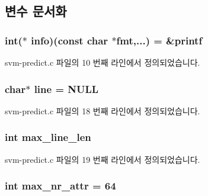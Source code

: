 \subsection{변수 문서화}
\hypertarget{svm-predict_8c_ab42d5f876cd10cdae152b4acbf2e7b8b}{
\subsubsection[{info}]{\setlength{\rightskip}{0pt plus 5cm}int($\ast$ info)(const char $\ast$fmt,...) = \&printf\hspace{0.3cm}{\ttfamily [static]}}}\label{svm-predict_8c_ab42d5f876cd10cdae152b4acbf2e7b8b}


svm-\/predict.\+c 파일의 10 번째 라인에서 정의되었습니다.

\hypertarget{svm-predict_8c_a8adb30f4f6669f927fd9232f686c637b}{
\subsubsection[{line}]{\setlength{\rightskip}{0pt plus 5cm}char$\ast$ line = N\+U\+L\+L\hspace{0.3cm}{\ttfamily [static]}}}\label{svm-predict_8c_a8adb30f4f6669f927fd9232f686c637b}


svm-\/predict.\+c 파일의 18 번째 라인에서 정의되었습니다.

\hypertarget{svm-predict_8c_acad24c15bee67d2026f56bc94a1188c7}{
\subsubsection[{max\+\_\+line\+\_\+len}]{\setlength{\rightskip}{0pt plus 5cm}int max\+\_\+line\+\_\+len\hspace{0.3cm}{\ttfamily [static]}}}\label{svm-predict_8c_acad24c15bee67d2026f56bc94a1188c7}


svm-\/predict.\+c 파일의 19 번째 라인에서 정의되었습니다.

\hypertarget{svm-predict_8c_af95bde9162db2c5dd97e80795b3548ed}{
\subsubsection[{max\+\_\+nr\+\_\+attr}]{\setlength{\rightskip}{0pt plus 5cm}int max\+\_\+nr\+\_\+attr = 64}}\label{svm-predict_8c_af95bde9162db2c5dd97e80795b3548ed}


